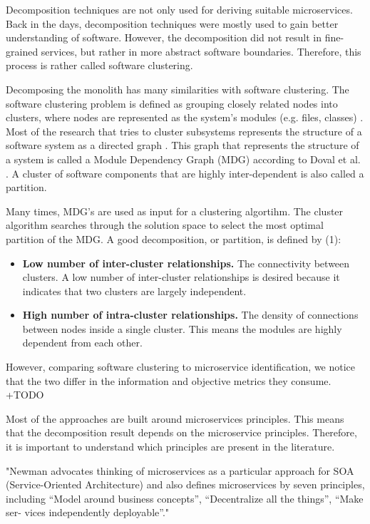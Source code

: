 Decomposition techniques are not only used for deriving suitable microservices. Back in the days, decomposition techniques were mostly used to gain better understanding of software. However, the decomposition did not result in fine-grained services, but rather in more abstract software boundaries. Therefore, this process is rather called software clustering. 

Decomposing the monolith has many similarities with software clustering. 
The software clustering problem is defined as grouping closely related nodes into clusters, where nodes are represented as the system's modules (e.g. files, classes) \cite{Doval1999}. Most of the research that tries to cluster subsystems represents the structure of a software system as a directed graph \cite{mitchell2003heuristic}. This graph that represents the structure of a system is called a Module Dependency Graph (MDG) according to Doval et al. \cite{Doval1999}. A cluster of software components that are highly inter-dependent is also called a partition. 

Many times, MDG's are used as input for a clustering algortihm. The cluster algorithm searches through the solution space to select the most optimal partition of the MDG. A good decomposition, or partition, is defined by (1):
\begin{itemize}
    \item \textbf{Low number of inter-cluster relationships.} The connectivity between clusters. A low number of inter-cluster relationships is desired because it indicates that two clusters are largely independent.
    \item \textbf{High number of intra-cluster relationships.} The density of connections between nodes inside a single cluster. This means the modules are highly dependent from each other.
\end{itemize}

However, comparing software clustering to microservice identification, we notice that the two differ in the information and objective metrics they consume.
+TODO


Most of the approaches are built around microservices principles. This means that the decomposition result depends on the microservice principles. Therefore, it is important to understand which principles are present in the literature.

"Newman advocates thinking of microservices as a particular approach for SOA (Service-Oriented Architecture) and also defines microservices by seven principles, including “Model around business concepts”, “Decentralize all the things”, “Make ser- vices independently deployable”."

